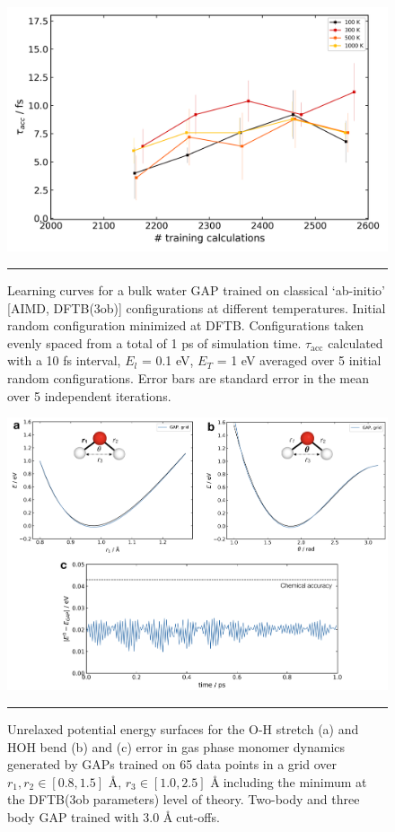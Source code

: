 \documentclass[../../main.tex]{subfiles}
\newcommand{\taua}{$\tau_\text{acc}$ }
\begin{document}
\begin{figure}[h!]
	\vspace{0.4cm}
	\centering
	\includegraphics[width=11.5cm]{6/gap/figs_si/fig8}
	\vspace{0.2cm}
	\hrule
	\caption{Learning curves for a bulk water GAP trained on classical `ab-initio’ [AIMD, DFTB(3ob)] configurations at different temperatures.  Initial random configuration minimized at DFTB. Configurations taken evenly spaced from a total of 1 ps of simulation time. \taua calculated with a 10 fs interval, $E_l$ = 0.1 eV, $E_T$ = 1 eV averaged over 5 initial random configurations. Error bars are standard error in the mean over 5 independent iterations.}
	\label{fig::ml_si_8}
\end{figure}



\begin{figure}[h!]
	\vspace{0.4cm}
	\centering
	\includegraphics[width=\textwidth]{6/gap/figs_si/fig9}
	\vspace{0.2cm}
	\hrule
	\caption{Unrelaxed potential energy surfaces for the O-H stretch (a) and HOH bend (b) and (c) error in gas phase monomer dynamics generated by GAPs trained on 65 data points in a grid over $r_1, r_2 \in [0.8, 1.5]$ \AA, $r_3  \in [1.0, 2.5]$ \AA$\;$including the minimum at the DFTB(3ob parameters) level of theory. Two-body and three body GAP trained with 3.0 \AA$\;$cut-offs.}
	\label{fig::ml_si_9}
\end{figure}
\end{document}
